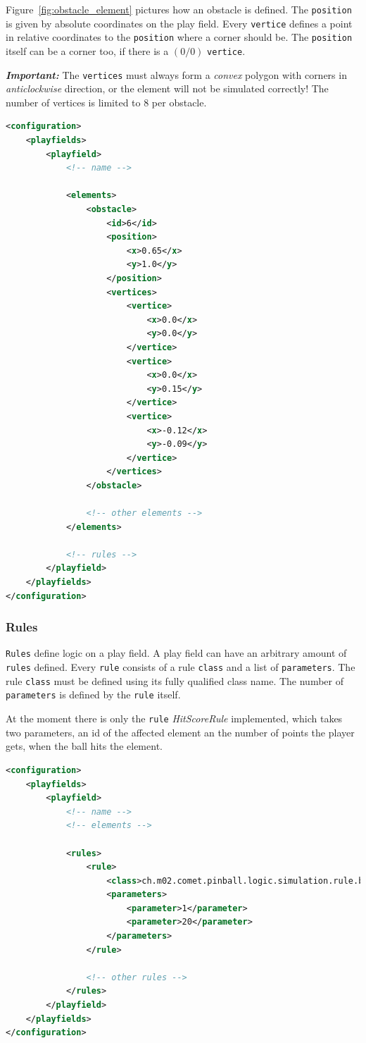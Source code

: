 \documentclass[fontsize=12pt,
               paper=a4,
               twoside=false,
               parskip=half,
               ]{scrartcl}
\begin{document}
Figure~\ref{fig:obstacle_element} pictures how an obstacle is defined. The \texttt{position} is given by absolute coordinates on the play field. Every \texttt{vertice} defines a point in relative coordinates to the \texttt{position} where a corner should be. The \texttt{position} itself can be a corner too, if there is a $(0/0)$ \texttt{vertice}.

\textbf{\textsl{Important:}} The \texttt{vertices} must always form a \textsl{convex} polygon with corners in \textsl{anticlockwise} direction, or the element will not be simulated correctly! The number of vertices is limited to 8 per obstacle.

\begin{minipage}[]{\linewidth}
\begin{lstlisting}[language=xml,label=lst:obstacle,caption={obstacle}]
<configuration>
	<playfields>
		<playfield>
			<!-- name -->
			
			<elements>
				<obstacle>
					<id>6</id>
					<position>
						<x>0.65</x>
						<y>1.0</y>
					</position>
					<vertices>
						<vertice>
							<x>0.0</x>
							<y>0.0</y>
						</vertice>
						<vertice>
							<x>0.0</x>
							<y>0.15</y>
						</vertice>
						<vertice>
							<x>-0.12</x>
							<y>-0.09</y>
						</vertice>
					</vertices>
				</obstacle>
				
				<!-- other elements -->
			</elements>
			
			<!-- rules -->
		</playfield>
	</playfields>
</configuration>
\end{lstlisting}
\end{minipage}

\subsubsection{Rules}

\texttt{Rules} define logic on a play field. A play field can have an arbitrary amount of \texttt{rules} defined. Every \texttt{rule} consists of a rule \texttt{class} and a list of \texttt{parameters}. The rule \texttt{class} must be defined using its fully qualified class name. The number of \texttt{parameters} is defined by the \texttt{rule} itself.

At the moment there is only the \texttt{rule} \emph{HitScoreRule} implemented, which takes two parameters, an id of the affected element an the number of points the player gets, when the ball hits the element.

\begin{minipage}[]{\linewidth}
\begin{lstlisting}[language=xml,label=lst:rule,caption={rule}]
<configuration>
	<playfields>
		<playfield>
			<!-- name -->
			<!-- elements -->
			
			<rules>
				<rule>
					<class>ch.m02.comet.pinball.logic.simulation.rule.basic.HitScoreRule</class>
					<parameters>
						<parameter>1</parameter>
						<parameter>20</parameter>
					</parameters>
				</rule>
				
				<!-- other rules -->
			</rules>
		</playfield>
	</playfields>
</configuration>
\end{lstlisting}
\end{minipage}
\end{document}
